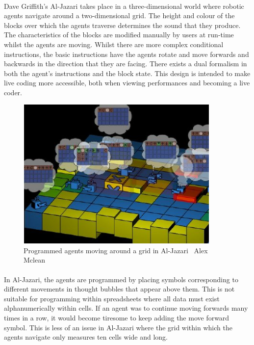 \paragraph{} Dave Griffith's Al-Jazari \cite{mclean:visualisation} takes place in a three-dimensional world where robotic agents navigate around a two-dimensional grid. The height and colour of the blocks over which the agents traverse determines the sound that they produce. The characteristics of the blocks are modified manually by users at run-time whilst the agents are moving. Whilst there are more complex conditional instructions, the basic instructions have the agents rotate and move forwards and backwards in the direction that they are facing. There exists a dual formalism in both the agent's instructions and the block state. This design is intended to make live coding more accessible, both when viewing performances and becoming a live coder.

\begin{figure}[ht]
  \centerline{\includegraphics[width=100mm]{figs/alJazari.jpg}}
\caption{Programmed agents moving around a grid in Al-Jazari \textcopyright\ Alex Mclean}
\label{prep:alJazari}
\end{figure}

\paragraph{} In Al-Jazari, the agents are programmed by placing symbols corresponding to different movements in thought bubbles that appear above them. This is not suitable for programming within spreadsheets where all data must exist alphanumerically within cells. If an agent was to continue moving forwards many times in a row, it would become tiresome to keep adding the move forward symbol. This is less of an issue in Al-Jazari where the grid within which the agents navigate only measures ten cells wide and long.

